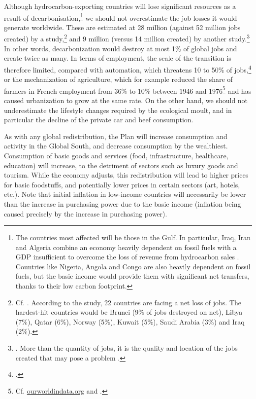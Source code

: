 \documentclass[a5paper,english,openany]{memoir}
\begin{document}
Although hydrocarbon-exporting countries will lose significant resources as a result of decarbonisation,\footnote{The countries most affected will be those in the Gulf. In particular, Iraq, Iran and Algeria combine an economy heavily dependent on fossil fuels with a GDP insufficient to overcome the loss of revenue from hydrocarbon sales \citep{muttitt_equity_2020}. Countries like Nigeria, Angola and Congo are also heavily dependent on fossil fuels, but the basic income would provide them with significant net transfers, thanks to their low carbon footprint.} we should not overestimate the job losses it would generate worldwide. These are estimated at 28 million (against 52 million jobs created) by a study,\footnote{Cf. \cite{jacobson_100_2017}. According to the study, 22 countries are facing a net loss of jobs. The hardest-hit countries would be Brunei (9\% of jobs destroyed on net), Libya (7\%), Qatar (6\%), Norway (5\%), Kuwait (5\%), Saudi Arabia (3\%) and Iraq (2\%).} and 9 million (versus 14 million created) by another study.\footnote{\cite{pai_meeting_2021}. More than the quantity of jobs, it is the quality and location of the jobs created that may pose a problem \citep{haywood_welfare_2021}.} In other words, decarbonization would destroy at most 1\% of global jobs and create twice as many. In terms of employment, the scale of the transition is therefore limited, compared with automation, which threatens 10 to 50\% of jobs,\footnote{\cite{frey_future_2017,lassebie_what_2022,hatzius_global_2023}.} or the mechanization of agriculture, which for example reduced the share of farmers in French employment from 36\% to 10\% between 1946 and 1976\footnote{Cf. \href{https://ourworldindata.org/grapher/urbanization-last-500-years?country=~FRA}{ourworldindata.org} and \href{https://ourworldindata.org/grapher/share-of-the-labor-force-employed-in-agriculture?tab=chart&time=1800..latest&country=FRA}{\cite{herrendorf_chapter_2014}}.} and has caused urbanization to grow at the same rate. On the other hand, we should not underestimate the lifestyle changes required by the ecological moult, and in particular the decline of the private car and beef consumption.

As with any global redistribution, the Plan will increase consumption and activity in the Global South, and decrease consumption by the wealthiest. Consumption of basic goods and services (food, infrastructure, healthcare, education) will increase, to the detriment of sectors such as luxury goods and tourism. While the economy adjusts, this redistribution will lead to higher prices for basic foodstuffs, and potentially lower prices in certain sectors (art, hotels, etc.).  
Note that initial inflation in low-income countries will necessarily be lower than the increase in purchasing power due to the basic income (inflation being caused precisely by the increase in purchasing power). 
\end{document}

